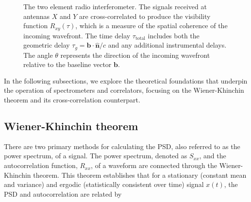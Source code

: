 \begin{figure}[h!]
      \caption[The two element radio interferometer]{The two element radio interferometer. The signals received at antennas $X$ and $Y$ are cross-correlated to produce the visibility function $R_{xy}(\tau)$, which is a measure of the spatial coherence of the incoming wavefront. The time delay $\tau_\text{total}$ includes both the geometric delay $\tau_g = \mathbf{b} \cdot \widehat{\mathbf{n}} / c$ and any additional instrumental delays. The angle $\theta$ represents the direction of the incoming wavefront relative to the baseline vector $\mathbf{b}$.}
	  \label{fig:correlator_schematic}
\end{figure}

In the following subsections, we explore the theoretical foundations that underpin the operation of spectrometers and correlators, focusing on the Wiener-Khinchin theorem and its cross-correlation counterpart.
\subsection{Wiener-Khinchin theorem}
There are two primary methods for calculating the PSD, also referred to as the power spectrum, of a signal. The power spectrum, denoted as $S_{xx}$, and the autocorrelation function, $R_{xx}$, of a waveform are connected through the Wiener-Khinchin theorem. This theorem establishes that for a stationary (constant mean and variance) and ergodic (statistically consistent over time) signal $x(t)$, the PSD and autocorrelation are related by

